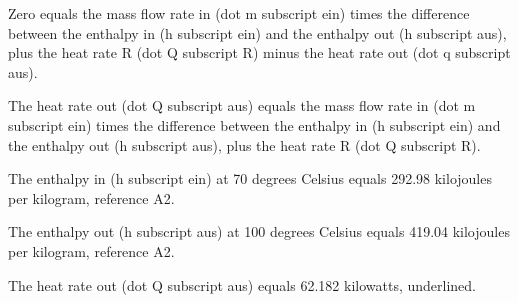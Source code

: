 Zero equals the mass flow rate in (dot m subscript ein) times the difference between the enthalpy in (h subscript ein) and the enthalpy out (h subscript aus), plus the heat rate R (dot Q subscript R) minus the heat rate out (dot q subscript aus).

The heat rate out (dot Q subscript aus) equals the mass flow rate in (dot m subscript ein) times the difference between the enthalpy in (h subscript ein) and the enthalpy out (h subscript aus), plus the heat rate R (dot Q subscript R).

The enthalpy in (h subscript ein) at 70 degrees Celsius equals 292.98 kilojoules per kilogram, reference A2.

The enthalpy out (h subscript aus) at 100 degrees Celsius equals 419.04 kilojoules per kilogram, reference A2.

The heat rate out (dot Q subscript aus) equals 62.182 kilowatts, underlined.